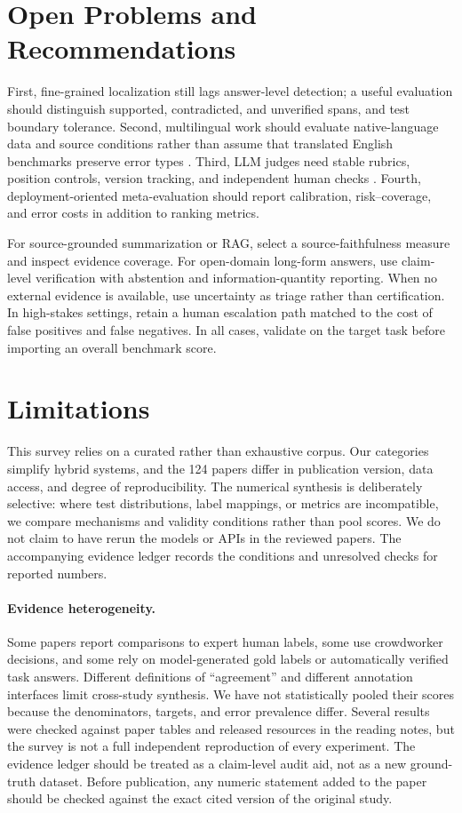\documentclass[11pt]{article}
\begin{document}
\section{Open Problems and Recommendations}
First, fine-grained localization still lags answer-level detection; a useful evaluation should distinguish supported, contradicted, and unverified spans, and test boundary tolerance. Second, multilingual work should evaluate native-language data and source conditions rather than assume that translated English benchmarks preserve error types \citep{I109,I111,I117}. Third, LLM judges need stable rubrics, position controls, version tracking, and independent human checks \citep{I105,I107}. Fourth, deployment-oriented meta-evaluation should report calibration, risk--coverage, and error costs in addition to ranking metrics.

For source-grounded summarization or RAG, select a source-faithfulness measure and inspect evidence coverage. For open-domain long-form answers, use claim-level verification with abstention and information-quantity reporting. When no external evidence is available, use uncertainty as triage rather than certification. In high-stakes settings, retain a human escalation path matched to the cost of false positives and false negatives. In all cases, validate on the target task before importing an overall benchmark score.

\section{Limitations}
This survey relies on a curated rather than exhaustive corpus. Our categories simplify hybrid systems, and the 124 papers differ in publication version, data access, and degree of reproducibility. The numerical synthesis is deliberately selective: where test distributions, label mappings, or metrics are incompatible, we compare mechanisms and validity conditions rather than pool scores. We do not claim to have rerun the models or APIs in the reviewed papers. The accompanying evidence ledger records the conditions and unresolved checks for reported numbers.

\paragraph{Evidence heterogeneity.} Some papers report comparisons to expert human labels, some use crowdworker decisions, and some rely on model-generated gold labels or automatically verified task answers. Different definitions of ``agreement'' and different annotation interfaces limit cross-study synthesis. We have not statistically pooled their scores because the denominators, targets, and error prevalence differ. Several results were checked against paper tables and released resources in the reading notes, but the survey is not a full independent reproduction of every experiment. The evidence ledger should be treated as a claim-level audit aid, not as a new ground-truth dataset. Before publication, any numeric statement added to the paper should be checked against the exact cited version of the original study.
\end{document}
